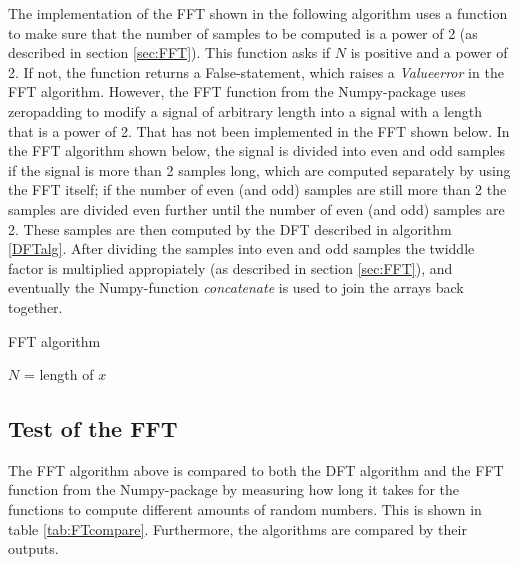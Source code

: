 The implementation of the FFT shown in the following algorithm uses a function to make sure that the number of samples to be computed is a power of 2 (as described in section \ref{sec:FFT}). This function asks if $N$ is positive and a power of 2. If not, the function returns a False-statement, which raises a \textit{Valueerror} in the FFT algorithm. However, the FFT function from the Numpy-package uses zeropadding to modify a signal of arbitrary length into a signal with a length that is a power of 2. That has not been implemented in the FFT shown below. In the FFT algorithm shown below, the signal is divided into even and odd samples if the signal is more than 2 samples long, which are computed separately by using the FFT itself; if the number of even (and odd) samples are still more than 2 the samples are divided even further until the number of even (and odd) samples are 2. These samples are then computed by the DFT described in algorithm \ref{DFTalg}. After dividing the samples into even and odd samples the twiddle factor is multiplied appropiately (as described in section \ref{sec:FFT}), and eventually the Numpy-function \textit{concatenate} is used to join the arrays back together.
\begin{algorithm}
\caption{FFT algorithm}
\label{FFTalg}
\begin{algorithmic}[1]

\EndProcedure

	\State $N$ = length of $x$ 
		 
	\Else
		 
		 
		 
	\EndIf
\EndProcedure
\end{algorithmic}
\end{algorithm}

\subsection{Test of the FFT}
The FFT algorithm above is compared to both the DFT algorithm and the FFT function from the Numpy-package by measuring how long it takes for the functions to compute different amounts of random numbers. This is shown in table \ref{tab:FTcompare}. Furthermore, the algorithms are compared by their outputs.

